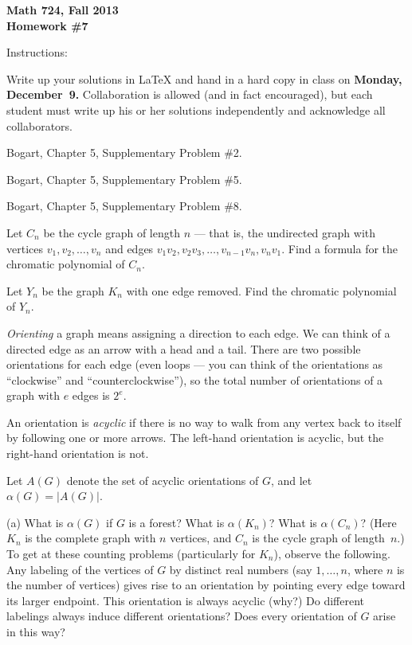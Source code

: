 


{\bf Math 724, Fall 2013\\
Homework \#7

Instructions:} Write up your solutions in LaTeX and hand in a hard copy in class on {\bf Monday, December~9.}  Collaboration is allowed (and in fact encouraged), but each student must write up his or her solutions independently and acknowledge all collaborators.

\prob Bogart, Chapter 5, Supplementary Problem \#2.

\prob Bogart, Chapter 5, Supplementary Problem \#5.

\prob Bogart, Chapter 5, Supplementary Problem \#8.

\prob Let $C_n$ be the cycle graph of length $n$ --- that is, the undirected graph with vertices $v_1,v_2,\dots,v_n$ and edges $v_1v_2,v_2v_3,\dots,v_{n-1}v_n,v_nv_1$.
Find a formula for the chromatic polynomial of $C_n$.

\prob Let $Y_n$ be the graph $K_n$ with one edge removed.  Find the chromatic polynomial of $Y_n$.

\prob \emph{Orienting} a graph means assigning a direction to each edge.  We can think of a directed edge as an arrow with a head and a tail.  There are two possible orientations for each edge (even loops --- you can think of the orientations as ``clockwise'' and ``counterclockwise''), so the total number of orientations of a graph with $e$ edges is $2^e$.

An orientation is \emph{acyclic} if there is no way to walk from any vertex back to itself by following one or more arrows.  The left-hand orientation is acyclic, but the right-hand orientation is not.

Let $A(G)$ denote the set of acyclic orientations of $G$, and let $\alpha(G)=|A(G)|$.

(a) What is $\alpha(G)$ if $G$ is a forest?  What is $\alpha(K_n)$?  What is $\alpha(C_n)$?  (Here $K_n$ is the complete graph with $n$ vertices, and
$C_n$ is the cycle graph of length~$n$.)
To get at these counting problems (particularly for $K_n$), observe the following.  Any labeling of the vertices of $G$ by distinct real numbers (say $1,\dots,n$, where $n$ is the number of vertices) gives rise to an orientation by pointing every edge toward its larger endpoint.  This orientation is always acyclic (why?)  Do different labelings always induce different orientations?  Does every orientation of $G$ arise in this way?

